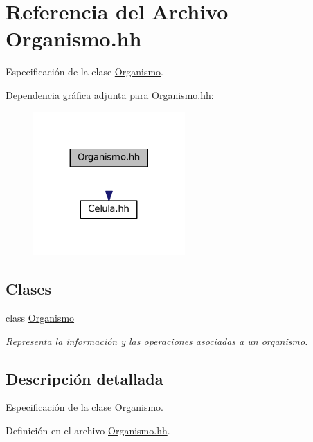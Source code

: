 \hypertarget{_organismo_8hh}{\section{Referencia del Archivo Organismo.\+hh}
\label{_organismo_8hh}
}


Especificación de la clase \hyperlink{class_organismo}{Organismo}.  


Dependencia gráfica adjunta para Organismo.\+hh\+:\nopagebreak
\begin{figure}[H]
\begin{center}
\leavevmode
\includegraphics[width=164pt]{_organismo_8hh__incl}
\end{center}
\end{figure}
\subsection*{Clases}
\begin{DoxyCompactItemize}
\item 
class \hyperlink{class_organismo}{Organismo}
\begin{DoxyCompactList}\small\item\em Representa la información y las operaciones asociadas a un organismo. \end{DoxyCompactList}\end{DoxyCompactItemize}


\subsection{Descripción detallada}
Especificación de la clase \hyperlink{class_organismo}{Organismo}. 



Definición en el archivo \hyperlink{_organismo_8hh_source}{Organismo.\+hh}.

